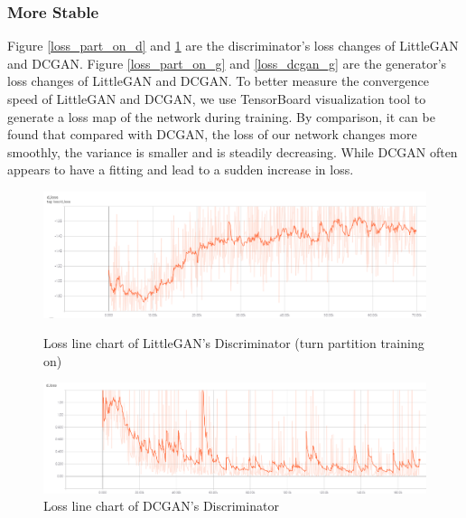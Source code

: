\subsubsection*{More Stable}
Figure \ref{loss_part_on_d} and \ref{loss_dcgan_d} are the discriminator's loss changes of LittleGAN and DCGAN.
Figure \ref{loss_part_on_g} and \ref{loss_dcgan_g} are the generator's loss changes of LittleGAN and DCGAN.
To better measure the convergence speed of LittleGAN and DCGAN,
    we use TensorBoard visualization tool to generate a loss map of the network during training.
By comparison, it can be found that compared with DCGAN,
    the loss of our network changes more smoothly, the variance is smaller and is steadily decreasing.
While DCGAN often appears to have a fitting and lead to a sudden increase in loss.

\begin{figure}
    \begin{minipage}[t]{0.49\linewidth}
        \centering
        \includegraphics[width=\textwidth]{figures/loss_part_on_d.png}
        \caption{Loss line chart of LittleGAN's Discriminator (turn partition training on)}
        \label{loss_part_on_d}
    \end{minipage}
        \hfill
    \begin{minipage}[t]{0.49\linewidth}
        \centering
        \includegraphics[width=\textwidth]{figures/loss_dcgan_d.png}
        \caption{Loss line chart of DCGAN's Discriminator}
        \label{loss_dcgan_d}
    \end{minipage}
\end{figure}

